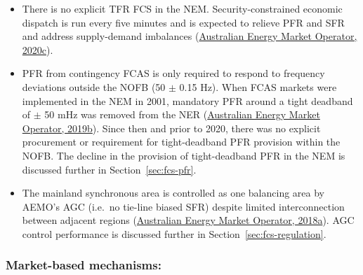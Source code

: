 \documentclass[12pt,a4paper,]{report}
\providecommand{\tightlist}{%
  \setlength{\itemsep}{0pt}\setlength{\parskip}{0pt}}
\begin{document}
\begin{itemize}
\tightlist
\item
  There is no explicit TFR FCS in the NEM. Security-constrained economic
  dispatch is run every five minutes and is expected to relieve PFR and
  SFR and address supply-demand imbalances
  (\protect\hyperlink{ref-australianenergymarketoperatorPowerSystemRequirements2020}{Australian
  Energy Market Operator, 2020c}).
\item
  PFR from contingency FCAS is only required to respond to frequency
  deviations outside the NOFB (50 \(\pm\) 0.15 Hz). When FCAS markets
  were implemented in the NEM in 2001, mandatory PFR around a tight
  deadband of \(\pm\) 50 mHz was removed from the NER
  (\protect\hyperlink{ref-australianenergymarketoperatorElectricityRuleChange2019}{Australian
  Energy Market Operator, 2019b}). Since then and prior to 2020, there
  was no explicit procurement or requirement for tight-deadband PFR
  provision within the NOFB. The decline in the provision of
  tight-deadband PFR in the NEM is discussed further in
  Section~\ref{sec:fcs-pfr}.
\item
  The mainland synchronous area is controlled as one balancing area by
  AEMO's AGC (i.e.~no tie-line biased SFR) despite limited
  interconnection between adjacent regions
  (\protect\hyperlink{ref-australianenergymarketoperatorAEMCFrequencyControl2018}{Australian
  Energy Market Operator, 2018a}). AGC control performance is discussed
  further in Section~\ref{sec:fcs-regulation}.
\end{itemize}

\hypertarget{market-based-mechanisms}{%
\subsubsection{Market-based mechanisms:}\label{market-based-mechanisms}}
\end{document}

